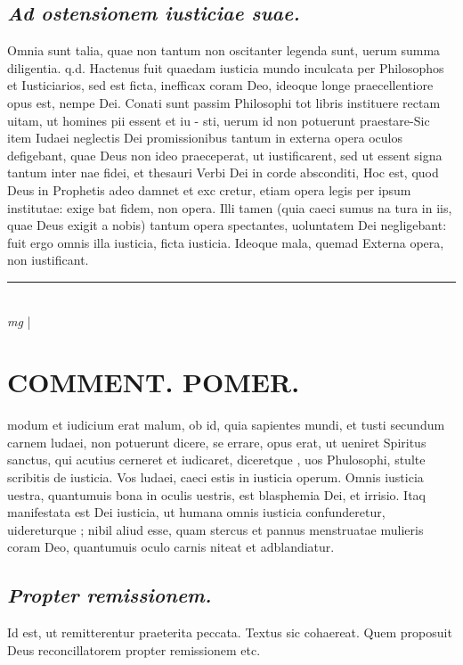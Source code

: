 \documentclass{article}
\begin{document}
\begin{pages}
\subsection*{\textit{Ad ostensionem iusticiae suae. }}\pstart Omnia sunt talia, quae non tantum non oscitanter legenda sunt, uerum summa diligentia. q.d.  Hactenus fuit quaedam iusticia mundo inculcata per Philosophos et Iusticiarios, sed est ficta, inefficax coram Deo, ideoque longe praecellentiore opus est, nempe Dei. Conati sunt passim Philosophi tot libris instituere rectam uitam, ut homines pii essent et iu - sti, uerum id non potuerunt praestare-Sic item Iudaei neglectis Dei promissionibus tantum in externa opera oculos defigebant, quae Deus non ideo praeceperat, ut iustificarent, sed ut essent signa tantum inter nae fidei, et thesauri Verbi Dei in corde absconditi, Hoc est, quod Deus in Prophetis adeo damnet et exc cretur, etiam opera legis per ipsum institutae: exige bat fidem, non opera. Illi tamen (quia caeci sumus na tura in iis, quae Deus exigit a nobis) tantum opera spectantes, uoluntatem Dei negligebant: fuit ergo omnis illa iusticia, ficta iusticia. Ideoque mala, quemad Externa opera, non iustificant.  \pend
\vspace{0.5cm}\noindent
\vspace{0.2cm}\rule{1cm}{0.2pt}\\ 
\hspace{0.2cm}\textit{mg}
\footnotesize 
\normalsize| 
\section*{COMMENT. POMER.  }\pstart modum et iudicium erat malum, ob id, quia sapientes mundi, et tusti secundum carnem ludaei, non potuerunt dicere, se errare, opus erat, ut ueniret Spiritus sanctus, qui acutius cerneret et iudicaret, diceretque , uos Phulosophi, stulte scribitis de iusticia. Vos ludaei, caeci estis in iusticia operum. Omnis iusticia uestra, quantumuis bona in oculis uestris, est blasphemia Dei, et irrisio. Itaq manifestata est Dei iusticia, ut humana omnis iusticia confunderetur, uidereturque ; nibil aliud esse, quam stercus et pannus menstruatae mulieris coram Deo, quantumuis oculo carnis niteat et adblandiatur.  \pend
{}
{}
\subsection*{\textit{Propter remissionem. }}\pstart Id est, ut remitterentur praeterita peccata. Textus sic cohaereat. Quem proposuit Deus reconcillatorem propter remissionem etc.   \pend
{}
{}

\end{pages}
\end{document}
